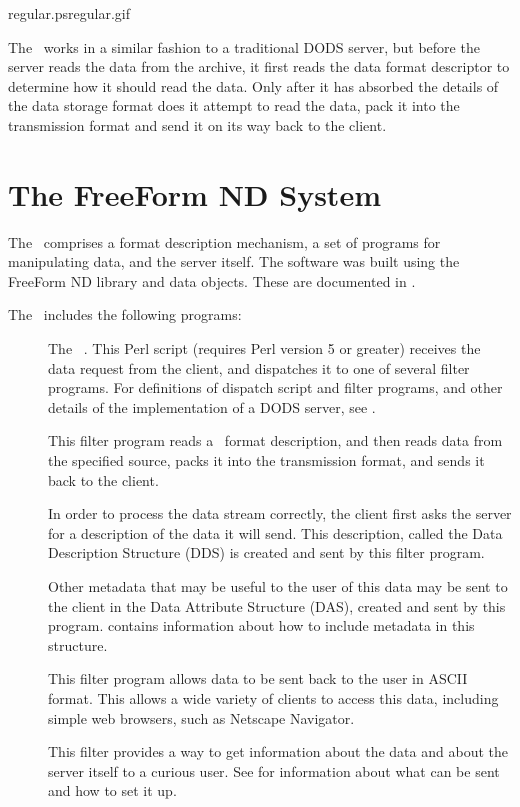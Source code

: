 {regular.ps}{regular.gif}{}

The \ffs\ works in a similar fashion to a traditional DODS server, but
before the server reads the data from the archive, it first reads the
data format descriptor to determine how it should read the data.  Only
after it has absorbed the details of the data storage format does it
attempt to read the data, pack it into the transmission format and
send it on its way back to the client.


\section{The FreeForm ND System}

The \ffs\ comprises a format description mechanism, a set of programs
for manipulating data, and the server itself.  The software was built
using the FreeForm ND library and data objects.  These are documented
in \ffbook .

The \ffs\ includes the following programs:

\begin{description}
\item[] The \ffs\ .  This Perl script
  (requires Perl version 5 or greater) receives the data request from
  the client, and dispatches it to one of several filter programs.
  For definitions of dispatch script and filter programs, and other
  details of the implementation of a DODS server, see \DODSuser .
  
\item[] This filter program reads a \ffnd\ format
  description, and then reads data from the specified source, packs it
  into the transmission format, and sends it back to the client.
  
\item[] In order to process the data stream correctly, the
  client first asks the server for a description of the data it will
  send.  This description, called the Data Description Structure (DDS)
  is created and sent by this filter program.
  
\item[] Other metadata that may be useful to the user of
  this data may be sent to the client in the Data Attribute Structure
  (DAS), created and sent by this program.  
  contains information about how to include metadata in this
  structure.
  
\item[] This filter program allows data to be sent back
  to the user in ASCII format.  This allows a wide variety of clients
  to access this data, including simple web browsers, such as Netscape
  Navigator.
  
\item[] This filter provides a way to get information about
  the data and about the server itself to a curious user.  See
   for information about what can be sent and how
  to set it up.
\end{description}

